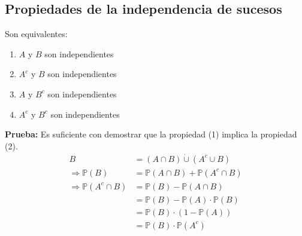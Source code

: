\documentclass[11pt]{article}
\newcommand{\prob}{\mathbb{P}}
\theoremstyle{plain}
\begin{document}
        \subsection{Propiedades de la independencia de sucesos} %
        \label{sub:propiedades_de_la_independencia_de_sucesos}
            Son equivalentes:
            \begin{enumerate}
                \item $A$ y $B$ son independientes
                \item $A^c$ y $B$ son independientes
                \item $A$ y $B^c$ son independientes
                \item $A^c$ y $B^c$ son independientes
            \end{enumerate}
            \textbf{Prueba:} Es suficiente con demostrar que la propiedad (1) implica la propiedad (2).
            \begin{equation}
                \begin{aligned}
                    B & = (A \cap B) \dot{\cup} (A^c \cup B)\\
                    \Rightarrow \prob (B) & = \prob(A \cap B) + \prob (A^c \cap B)\\
                    \Rightarrow \prob (A^c \cap B) & = \prob (B) - \prob(A\cap B)\\
                    & = \prob (B) - \prob(A) \cdot \prob(B)\\
                    & = \prob (B) \cdot (1 - \prob(A))\\
                    & = \prob (B) \cdot \prob(A^c)
                \end{aligned}
            \end{equation}
\end{document}
